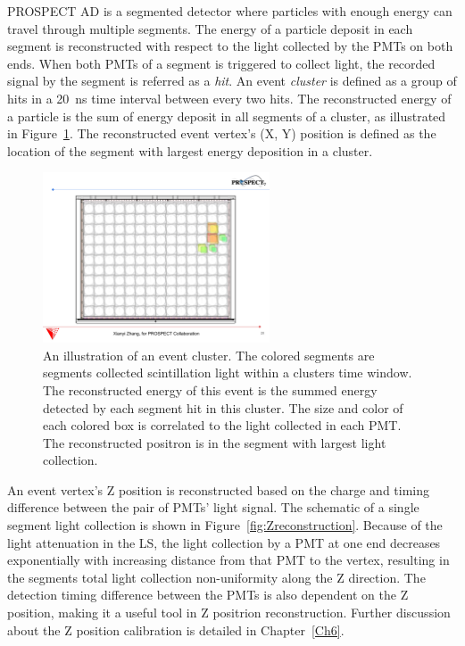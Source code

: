	PROSPECT AD is a segmented detector where particles with enough energy can travel through multiple segments.
	The energy of a particle deposit in each segment is reconstructed with respect to the light collected by the PMTs on both ends.
	When both PMTs of a segment is triggered to collect light, the recorded signal by the segment is referred as a \textit{hit}.
	An event \textit{cluster} is defined as a group of hits in a 20~ns time interval between every two hits. 
	The reconstructed energy of a particle is the sum of energy deposit in all segments of a cluster, as illustrated in Figure~\ref{fig:ClusterScheme}.
	The reconstructed event vertex's (X, Y) position is defined as the location of the segment with largest energy deposition in a cluster.
\begin{figure}[h]
    \centering
    \includegraphics[width=0.6\textwidth]{Figures/ClusterScheme.pdf}
    \caption[An illustration of an event cluster]{
	An illustration of an event cluster. The colored segments are segments collected scintillation light within a clusters time window.
	The reconstructed energy of this event is the summed energy detected by each segment hit in this cluster.
	The size and color of each colored box is correlated to the light collected in each PMT.
	The reconstructed positron is in the segment with largest light collection.
	}
    \label{fig:ClusterScheme}
\end{figure}
	
	An event vertex's Z position is reconstructed based on the charge and timing difference between the pair of PMTs' light signal.
	The schematic of a single segment light collection is shown in Figure~\ref{fig:Zreconstruction}.
	Because of the light attenuation in the LS, the light collection by a PMT at one end decreases exponentially with increasing distance from that PMT to the vertex, resulting in the segments total light collection non-uniformity along the Z direction.
	The detection timing difference between the PMTs is also dependent on the Z position, making it a useful tool in Z positrion reconstruction.
	Further discussion about the Z position calibration is detailed in Chapter~\ref{Ch6}.
	
